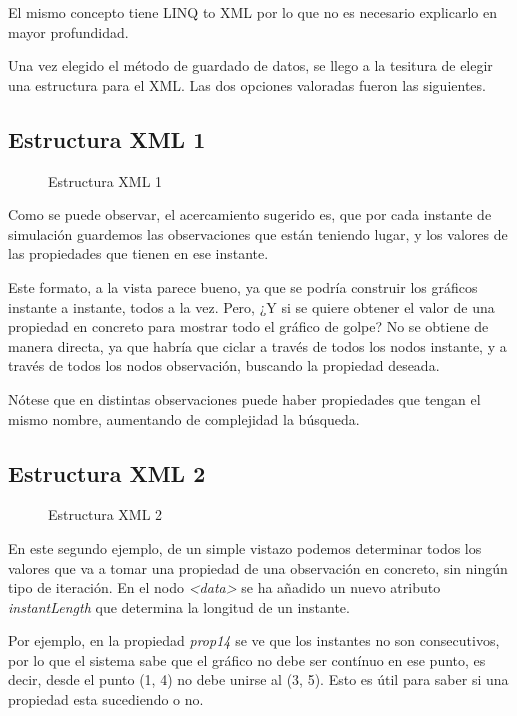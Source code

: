 El mismo concepto tiene LINQ to XML por lo que no es necesario explicarlo en mayor profundidad.

Una vez elegido el m\'etodo de guardado de datos, se llego a la tesitura de elegir una estructura para el XML.
Las dos opciones valoradas fueron las siguientes.

\subsection{Estructura XML 1}
\begin{figure}[H]
	
	\caption[Estructura XML 1]{Estructura XML 1}
	\label{Estructura XML1}
\end{figure}


Como se puede observar, el acercamiento sugerido es, que por cada instante de simulaci\'{o}n guardemos las observaciones que 
est\'{a}n teniendo lugar,
y los valores de las propiedades que tienen en ese instante.

Este formato, a la vista parece bueno, ya que se podr\'{i}a construir los gr\'{a}ficos instante a instante, todos a la vez. 
Pero, ¿Y si se quiere
obtener el valor de una propiedad en concreto para mostrar todo el gr\'{a}fico de golpe? No se obtiene de manera directa, ya que 
habr\'{i}a que ciclar
a trav\'{e}s de todos los nodos instante, y a trav\'{e}s de todos los nodos observaci\'{o}n, buscando la propiedad deseada. 

N\'{o}tese que en distintas observaciones puede haber propiedades que tengan el mismo nombre, aumentando de complejidad la 
b\'{u}squeda.

\subsection{Estructura XML 2}
\begin{figure}[H]
	
	\caption[Estructura XML 2]{Estructura XML 2}
	\label{Estructura XML2}
\end{figure}

En este segundo ejemplo, de un simple vistazo podemos determinar todos los valores que va a tomar una propiedad de una 
observaci\'{o}n en concreto,
sin ning\'{u}n tipo de iteraci\'{o}n. En el nodo \emph{<data>} se ha a\~{n}adido un nuevo atributo \emph{instantLength} que 
determina la longitud de un instante. 

Por ejemplo, en la propiedad \emph{prop14} se ve que los instantes no son consecutivos, por lo que el sistema sabe que el 
gr\'{a}fico no debe ser cont\'inuo en ese punto, es decir, desde el punto (1, 4) no debe unirse al 
(3, 5). Esto es \'{u}til para saber si una propiedad esta sucediendo o no.

